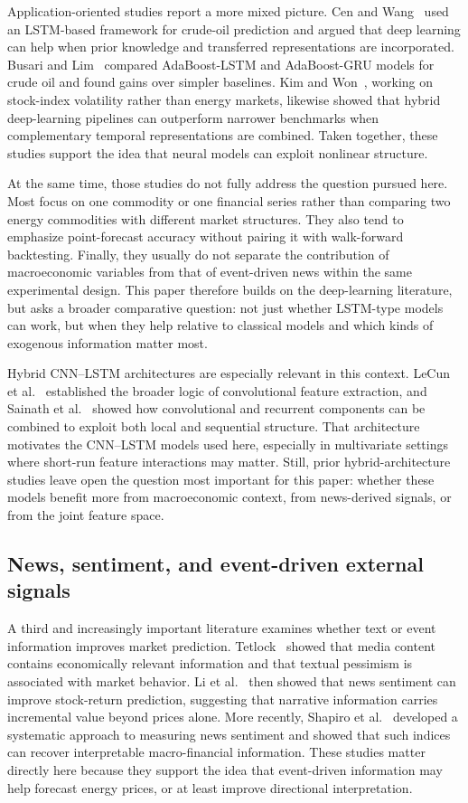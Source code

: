 \documentclass[pdflatex,sn-mathphys-num]{sn-jnl}%
\theoremstyle{thmstyleone}%
\theoremstyle{thmstyletwo}%
\theoremstyle{thmstylethree}%
\begin{document}
Application-oriented studies report a more mixed picture. Cen and Wang~\cite{cen2019} used an LSTM-based framework for crude-oil prediction and argued that deep learning can help when prior knowledge and transferred representations are incorporated. Busari and Lim~\cite{busari2021} compared AdaBoost-LSTM and AdaBoost-GRU models for crude oil and found gains over simpler baselines. Kim and Won~\cite{kim2018}, working on stock-index volatility rather than energy markets, likewise showed that hybrid deep-learning pipelines can outperform narrower benchmarks when complementary temporal representations are combined. Taken together, these studies support the idea that neural models can exploit nonlinear structure.

At the same time, those studies do not fully address the question pursued here. Most focus on one commodity or one financial series rather than comparing two energy commodities with different market structures. They also tend to emphasize point-forecast accuracy without pairing it with walk-forward backtesting. Finally, they usually do not separate the contribution of macroeconomic variables from that of event-driven news within the same experimental design. This paper therefore builds on the deep-learning literature, but asks a broader comparative question: not just whether LSTM-type models can work, but when they help relative to classical models and which kinds of exogenous information matter most.

Hybrid CNN--LSTM architectures are especially relevant in this context. LeCun et al.~\cite{lecun1998} established the broader logic of convolutional feature extraction, and Sainath et al.~\cite{sainath2015} showed how convolutional and recurrent components can be combined to exploit both local and sequential structure. That architecture motivates the CNN--LSTM models used here, especially in multivariate settings where short-run feature interactions may matter. Still, prior hybrid-architecture studies leave open the question most important for this paper: whether these models benefit more from macroeconomic context, from news-derived signals, or from the joint feature space.

\subsection*{News, sentiment, and event-driven external signals}
A third and increasingly important literature examines whether text or event information improves market prediction. Tetlock~\cite{tetlock2007} showed that media content contains economically relevant information and that textual pessimism is associated with market behavior. Li et al.~\cite{li2014} then showed that news sentiment can improve stock-return prediction, suggesting that narrative information carries incremental value beyond prices alone. More recently, Shapiro et al.~\cite{shapiro2022} developed a systematic approach to measuring news sentiment and showed that such indices can recover interpretable macro-financial information. These studies matter directly here because they support the idea that event-driven information may help forecast energy prices, or at least improve directional interpretation.
\end{document}
